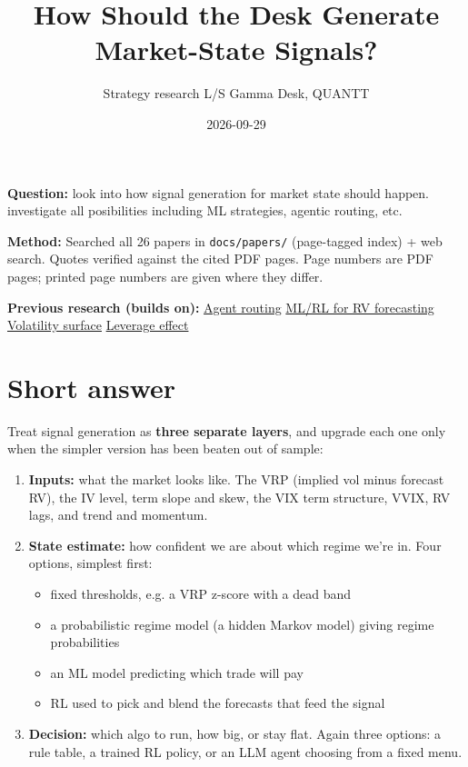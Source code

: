 \documentclass{article}
\title{How Should the Desk Generate Market-State Signals?}
\author{Strategy research \textperiodcentered{} L/S Gamma Desk, QUANTT}
\date{2026-09-29}
\begin{document}
\maketitle

\textbf{Question:} look into how signal generation for market state should happen. investigate all posibilities including ML strategies, agentic routing, etc.

\textbf{Method:} Searched all 26 papers in \texttt{docs/\allowbreak{}papers/\allowbreak{}} (page-tagged index) + web search. Quotes verified against the cited PDF pages. Page numbers are PDF pages; printed page numbers are given where they differ.

\textbf{Previous research (builds on):} \href{2026-09-27-agent-routing-which-algo-to-run.pdf}{Agent routing} \textperiodcentered{} \href{2026-09-27-ml-rl-for-realised-volatility-forecasting.pdf}{ML/\allowbreak{}RL for RV forecasting} \textperiodcentered{} \href{2026-09-27-volatility-surface-for-the-strategy.pdf}{Volatility surface} \textperiodcentered{} \href{2026-09-27-leverage-effect-and-the-ls-gamma-desk.pdf}{Leverage effect}

\section{Short answer}

Treat signal generation as \textbf{three separate layers}, and upgrade each one only when the simpler version has been beaten out of sample:

\begin{enumerate}

\item \textbf{Inputs:} what the market looks like. The VRP (implied vol minus forecast RV), the IV level, term slope and skew, the VIX term structure, VVIX, RV lags, and trend and momentum.

\item \textbf{State estimate:} how confident we are about which regime we're in. Four options, simplest first:

\begin{itemize}

\item fixed thresholds, e.g. a VRP z-score with a dead band

\item a probabilistic regime model (a hidden Markov model) giving regime probabilities

\item an ML model predicting which trade will pay

\item RL used to pick and blend the forecasts that feed the signal

\end{itemize}

\item \textbf{Decision:} which algo to run, how big, or stay flat. Again three options: a rule table, a trained RL policy, or an LLM agent choosing from a fixed menu.

\end{enumerate}
\end{document}
